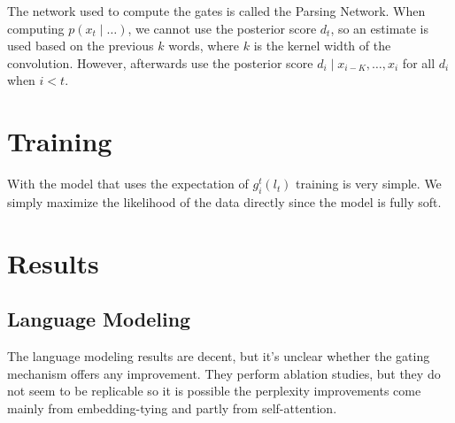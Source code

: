 \documentclass{article}
\begin{document}
The network used to compute the gates is called the Parsing Network.
When computing $p(x_t\mid\ldots)$, we cannot use the posterior score $d_t$,
so an estimate is used based on the previous $k$ words, where $k$ is the 
kernel width of the convolution.
However, afterwards \citet{shen2018prpn} use the posterior score $d_i \mid x_{i-K},\ldots, x_i$
for all $d_i$ when $i < t$.

\section{Training}
With the model that uses the expectation of $g_i^t(l_t)$ training is very simple.
We simply maximize the likelihood of the data directly since the model 
is fully soft.

\section{Results}
\subsection{Language Modeling}

The language modeling results are decent, but it's unclear whether the
gating mechanism offers any improvement.
They perform ablation studies, but they do not seem to be replicable
so it is possible the perplexity improvements come 
mainly from embedding-tying and partly from self-attention.
\end{document}
